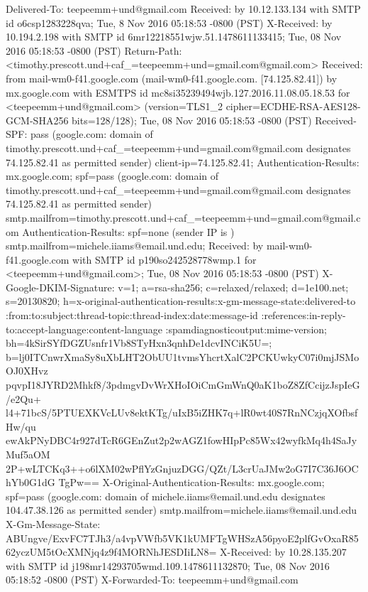 \begin{itemize}
\begin{itemize}
Delivered-To: teepeemm+und@gmail.com
Received: by 10.12.133.134 with SMTP id o6csp1283228qva;
        Tue, 8 Nov 2016 05:18:53 -0800 (PST)
X-Received: by 10.194.2.198 with SMTP id 6mr12218551wjw.51.1478611133415;
        Tue, 08 Nov 2016 05:18:53 -0800 (PST)
Return-Path: <timothy.prescott.und+caf_=teepeemm+und=gmail.com@gmail.com>
Received: from mail-wm0-f41.google.com (mail-wm0-f41.google.com. [74.125.82.41])
        by mx.google.com with ESMTPS id mc8si35239494wjb.127.2016.11.08.05.18.53
        for <teepeemm+und@gmail.com>
        (version=TLS1_2 cipher=ECDHE-RSA-AES128-GCM-SHA256 bits=128/128);
        Tue, 08 Nov 2016 05:18:53 -0800 (PST)
Received-SPF: pass (google.com: domain of timothy.prescott.und+caf_=teepeemm+und=gmail.com@gmail.com designates 74.125.82.41 as permitted sender) client-ip=74.125.82.41;
Authentication-Results: mx.google.com;
       spf=pass (google.com: domain of timothy.prescott.und+caf_=teepeemm+und=gmail.com@gmail.com designates 74.125.82.41 as permitted sender) smtp.mailfrom=timothy.prescott.und+caf_=teepeemm+und=gmail.com@gmail.com
Authentication-Results: spf=none (sender IP is ) smtp.mailfrom=michele.iiams@email.und.edu;
Received: by mail-wm0-f41.google.com with SMTP id p190so242528778wmp.1
        for <teepeemm+und@gmail.com>; Tue, 08 Nov 2016 05:18:53 -0800 (PST)
X-Google-DKIM-Signature: v=1; a=rsa-sha256; c=relaxed/relaxed;
        d=1e100.net; s=20130820;
        h=x-original-authentication-results:x-gm-message-state:delivered-to
         :from:to:subject:thread-topic:thread-index:date:message-id
         :references:in-reply-to:accept-language:content-language
         :spamdiagnosticoutput:mime-version;
        bh=4kSirSYfDGZUsnfr1Vb8STyHxn3qnhDe1dcvINCiK5U=;
        b=lj0ITCnwrXmaSy8uXbLHT2ObUU1tvmsYhcrtXalC2PCKUwkyC07i0mjJSMoOJ0XHvz
         pqvpI18JYRD2Mhkf8/3pdmgvDvWrXHoIOiCmGmWnQ0aK1boZ8ZfCcijzJspIeG/e2Qu+
         l4+71bcS/5PTUEXKVcLUv8ektKTg/uIxB5iZHK7q+lR0wt40S7RnNCzjqXOfbsfHw/qu
         ewAkPNyDBC4r927dTcR6GEnZut2p2wAGZ1fowHIpPc85Wx42wyfkMq4h4SaJyMuf5aOM
         2P+wLTCKq3++o6lXM02wPflYzGnjuzDGG/QZt/L3crUaJMw2oG7I7C36J6OChYb0G1dG
         TgPw==
X-Original-Authentication-Results: mx.google.com;
       spf=pass (google.com: domain of michele.iiams@email.und.edu designates 104.47.38.126 as permitted sender) smtp.mailfrom=michele.iiams@email.und.edu
X-Gm-Message-State: ABUngve/ExvFC7TJh3/a4vpVWfb5VK1kUMFTgWHSzA56pyoE2plfGvOxaR8562yczUM5tOcXMNjq4z9f4MORNhJESDIiLN8=
X-Received: by 10.28.135.207 with SMTP id j198mr14293705wmd.109.1478611132870;
        Tue, 08 Nov 2016 05:18:52 -0800 (PST)
X-Forwarded-To: teepeemm+und@gmail.com

\end{itemize}
\end{itemize}
